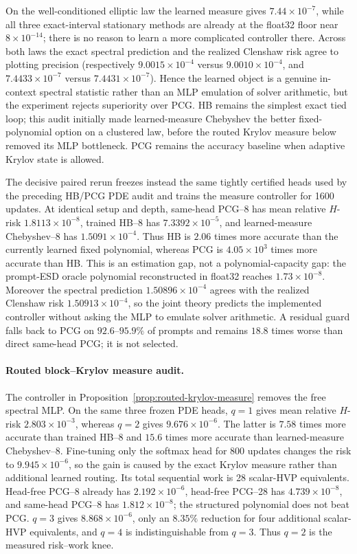 \documentclass[11pt]{article}
\begin{document}
On the well-conditioned elliptic law the learned measure gives
\(7.44\times10^{-7}\), while all three exact-interval stationary methods are
already at the float32 floor near \(8\times10^{-14}\); there is no reason to
learn a more complicated controller there.  Across both laws the exact
spectral prediction and the realized Clenshaw risk agree to plotting
precision (respectively \(9.0015\times10^{-4}\) versus
\(9.0010\times10^{-4}\), and \(7.4433\times10^{-7}\) versus
\(7.4431\times10^{-7}\)).  Hence the learned object is a genuine in-context
spectral statistic rather than an MLP emulation of solver arithmetic, but the
experiment rejects superiority over PCG.  HB remains the simplest exact tied
loop; this audit initially made learned-measure Chebyshev the better
fixed-polynomial option on a clustered law, before the routed Krylov measure
below removed its MLP bottleneck.  PCG remains the accuracy baseline when
adaptive Krylov state is allowed.

The decisive paired rerun freezes instead the same tightly certified heads
used by the preceding HB/PCG PDE audit and trains the measure controller for
1600 updates.  At identical setup and depth, same-head PCG--8 has mean
relative \(H\)-risk \(1.8113\times10^{-8}\), trained HB--8 has
\(7.3392\times10^{-5}\), and learned-measure Chebyshev--8 has
\(1.5091\times10^{-4}\).  Thus HB is \(2.06\) times more accurate than the
currently learned fixed polynomial, whereas PCG is \(4.05\times10^3\) times
more accurate than HB.  This is an estimation gap, not a polynomial-capacity
gap: the prompt-ESD oracle polynomial reconstructed in float32 reaches
\(1.73\times10^{-8}\).  Moreover the spectral prediction
\(1.50896\times10^{-4}\) agrees with the realized Clenshaw risk
\(1.50913\times10^{-4}\), so the joint theory predicts the implemented
controller without asking the MLP to emulate solver arithmetic.  A residual
guard falls back to PCG on \(92.6\)--\(95.9\%\) of prompts and remains
\(18.8\) times worse than direct same-head PCG; it is not selected.

\paragraph{Routed block--Krylov measure audit.}
The controller in Proposition~\ref{prop:routed-krylov-measure} removes the
free spectral MLP.  On the same three frozen PDE heads, \(q=1\) gives mean
relative \(H\)-risk \(2.803\times10^{-3}\), whereas \(q=2\) gives
\(9.676\times10^{-6}\).  The latter is \(7.58\) times more accurate than
trained HB--8 and \(15.6\) times more accurate than learned-measure
Chebyshev--8.  Fine-tuning only the softmax head for 800 updates changes the
risk to \(9.945\times10^{-6}\), so the gain is caused by the exact Krylov
measure rather than additional learned routing.  Its total sequential work
is 28 scalar-HVP equivalents.  Head-free PCG--8 already has
\(2.192\times10^{-6}\), head-free PCG--28 has \(4.739\times10^{-8}\), and
same-head PCG--8 has \(1.812\times10^{-8}\); the structured polynomial does
not beat PCG.  \(q=3\) gives \(8.868\times10^{-6}\), only an \(8.35\%\)
reduction for four
additional scalar-HVP equivalents, and \(q=4\) is indistinguishable from
\(q=3\).  Thus \(q=2\) is the measured risk--work knee.
\end{document}
